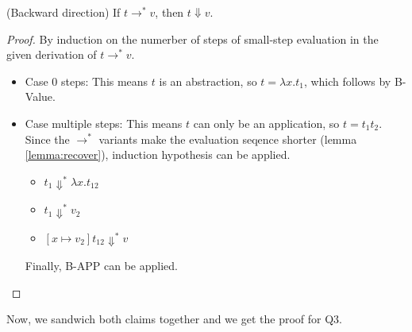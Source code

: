 \documentclass[12pt]{article}
\begin{document}
\begin{claim}
(Backward direction) If $t \rightarrow^* v$, then $t \Downarrow v$.
\end{claim}
\begin{proof}
By induction on the numerber of steps of small-step evaluation in the given derivation of $t \rightarrow^* v$.
\begin{itemize}
\item
Case 0 steps:
This means $t$ is an abstraction, so $t = \lambda x . t_1$, which follows by B-Value.
\item
Case multiple steps:
This means $t$ can only be an application, so $t = t_1t_2$.
Since the $\rightarrow^*$ variants make the evaluation seqence shorter (lemma \ref{lemma:recover}), induction hypothesis can be applied.
\begin{itemize}
\item
$t_1 \Downarrow^* \lambda x . t_{12}$
\item
$t_1 \Downarrow^* v_2$
\item
$[x \mapsto v_2] t_{12} \Downarrow^* v$
\end{itemize}
Finally, B-APP can be applied.
\end{itemize}
\end{proof}
Now, we sandwich both claims together and we get the proof for Q3.
\done
\end{document}
